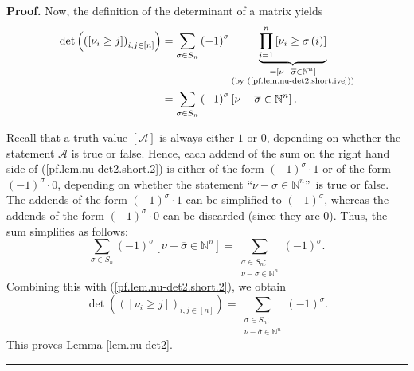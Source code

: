 \documentclass
[numbers=enddot,12pt,final,onecolumn,notitlepage,english]{scrartcl}%
\theoremstyle{definition}
\newenvironment{proof}[1][Proof]{\noindent\textbf{#1.} }{\ \rule{0.5em}{0.5em}}
\let\sumnonlimits\sum
\let\prodnonlimits\prod
\renewcommand{\sum}{\sumnonlimits\limits}
\renewcommand{\prod}{\prodnonlimits\limits}
\newenvironment{vershort}{}{}
\begin{document}
\begin{vershort}
\begin{proof}
Now, the definition of the determinant of a matrix yields%
\begin{align}
\det\left(  \left(  \left[  \nu_{i}\geq j\right]  \right)  _{i,j\in\left[
n\right]  }\right)   &  =\sum_{\sigma\in S_{n}}\left(  -1\right)  ^{\sigma
}\underbrace{\prod_{i=1}^{n}\left[  \nu_{i}\geq\sigma\left(  i\right)
\right]  }_{\substack{=\left[  \nu-\overline{\sigma}\in\mathbb{N}^{n}\right]
\\\text{(by (\ref{pf.lem.nu-det2.short.ive}))}}}\nonumber\\
&  =\sum_{\sigma\in S_{n}}\left(  -1\right)  ^{\sigma}\left[  \nu
-\overline{\sigma}\in\mathbb{N}^{n}\right]  . \label{pf.lem.nu-det2.short.2}%
\end{align}


Recall that a truth value $\left[  \mathcal{A}\right]  $ is always either $1$
or $0$, depending on whether the statement $\mathcal{A}$ is true or false.
Hence, each addend of the sum on the right hand side of
(\ref{pf.lem.nu-det2.short.2}) is either of the form $\left(  -1\right)
^{\sigma}\cdot1$ or of the form $\left(  -1\right)  ^{\sigma}\cdot0$,
depending on whether the statement \textquotedblleft$\nu-\overline{\sigma}%
\in\mathbb{N}^{n}$\textquotedblright\ is true or false. The addends of the
form $\left(  -1\right)  ^{\sigma}\cdot1$ can be simplified to $\left(
-1\right)  ^{\sigma}$, whereas the addends of the form $\left(  -1\right)
^{\sigma}\cdot0$ can be discarded (since they are $0$). Thus, the sum
simplifies as follows:%
\[
\sum_{\sigma\in S_{n}}\left(  -1\right)  ^{\sigma}\left[  \nu-\overline
{\sigma}\in\mathbb{N}^{n}\right]  =\sum_{\substack{\sigma\in S_{n}%
;\\\nu-\overline{\sigma}\in\mathbb{N}^{n}}}\left(  -1\right)  ^{\sigma}.
\]
Combining this with (\ref{pf.lem.nu-det2.short.2}), we obtain
\[
\det\left(  \left(  \left[  \nu_{i}\geq j\right]  \right)  _{i,j\in\left[
n\right]  }\right)  =\sum_{\substack{\sigma\in S_{n};\\\nu-\overline{\sigma
}\in\mathbb{N}^{n}}}\left(  -1\right)  ^{\sigma}.
\]
This proves Lemma \ref{lem.nu-det2}.
\end{proof}
\end{vershort}
\end{document}

